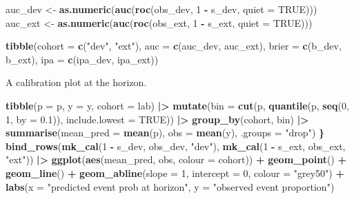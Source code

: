 \documentclass[
]{article}
\newenvironment{Shaded}{\begin{snugshade}}{\end{snugshade}}
\newcommand{\AttributeTok}[1]{\textcolor[rgb]{0.13,0.29,0.53}{#1}}
\newcommand{\ConstantTok}[1]{\textcolor[rgb]{0.56,0.35,0.01}{#1}}
\newcommand{\DecValTok}[1]{\textcolor[rgb]{0.00,0.00,0.81}{#1}}
\newcommand{\ErrorTok}[1]{\textcolor[rgb]{0.64,0.00,0.00}{\textbf{#1}}}
\newcommand{\FloatTok}[1]{\textcolor[rgb]{0.00,0.00,0.81}{#1}}
\newcommand{\FunctionTok}[1]{\textcolor[rgb]{0.13,0.29,0.53}{\textbf{#1}}}
\newcommand{\NormalTok}[1]{#1}
\newcommand{\OtherTok}[1]{\textcolor[rgb]{0.56,0.35,0.01}{#1}}
\newcommand{\SpecialCharTok}[1]{\textcolor[rgb]{0.81,0.36,0.00}{\textbf{#1}}}
\newcommand{\StringTok}[1]{\textcolor[rgb]{0.31,0.60,0.02}{#1}}
\begin{document}
\begin{Shaded}
\begin{Highlighting}[]
\NormalTok{auc\_dev }\OtherTok{\textless{}{-}} \FunctionTok{as.numeric}\NormalTok{(}\FunctionTok{auc}\NormalTok{(}\FunctionTok{roc}\NormalTok{(obs\_dev, }\DecValTok{1} \SpecialCharTok{{-}}\NormalTok{ s\_dev, }\AttributeTok{quiet =} \ConstantTok{TRUE}\NormalTok{)))}
\NormalTok{auc\_ext }\OtherTok{\textless{}{-}} \FunctionTok{as.numeric}\NormalTok{(}\FunctionTok{auc}\NormalTok{(}\FunctionTok{roc}\NormalTok{(obs\_ext, }\DecValTok{1} \SpecialCharTok{{-}}\NormalTok{ s\_ext, }\AttributeTok{quiet =} \ConstantTok{TRUE}\NormalTok{)))}

\FunctionTok{tibble}\NormalTok{(}\AttributeTok{cohort =} \FunctionTok{c}\NormalTok{(}\StringTok{"dev"}\NormalTok{, }\StringTok{"ext"}\NormalTok{),}
       \AttributeTok{auc =} \FunctionTok{c}\NormalTok{(auc\_dev, auc\_ext),}
       \AttributeTok{brier =} \FunctionTok{c}\NormalTok{(b\_dev, b\_ext),}
       \AttributeTok{ipa  =} \FunctionTok{c}\NormalTok{(ipa\_dev, ipa\_ext))}
\end{Highlighting}
\end{Shaded}

A calibration plot at the horizon.

\begin{Shaded}
\begin{Highlighting}[]
  \FunctionTok{tibble}\NormalTok{(}\AttributeTok{p =}\NormalTok{ p, }\AttributeTok{y =}\NormalTok{ y, }\AttributeTok{cohort =}\NormalTok{ lab) }\SpecialCharTok{|\textgreater{}}
    \FunctionTok{mutate}\NormalTok{(}\AttributeTok{bin =} \FunctionTok{cut}\NormalTok{(p, }\FunctionTok{quantile}\NormalTok{(p, }\FunctionTok{seq}\NormalTok{(}\DecValTok{0}\NormalTok{, }\DecValTok{1}\NormalTok{, }\AttributeTok{by =} \FloatTok{0.1}\NormalTok{)),}
                     \AttributeTok{include.lowest =} \ConstantTok{TRUE}\NormalTok{)) }\SpecialCharTok{|\textgreater{}}
    \FunctionTok{group\_by}\NormalTok{(cohort, bin) }\SpecialCharTok{|\textgreater{}}
    \FunctionTok{summarise}\NormalTok{(}\AttributeTok{mean\_pred =} \FunctionTok{mean}\NormalTok{(p), }\AttributeTok{obs =} \FunctionTok{mean}\NormalTok{(y), }\AttributeTok{.groups =} \StringTok{"drop"}\NormalTok{)}
\ErrorTok{\}}
\FunctionTok{bind\_rows}\NormalTok{(}\FunctionTok{mk\_cal}\NormalTok{(}\DecValTok{1} \SpecialCharTok{{-}}\NormalTok{ s\_dev, obs\_dev, }\StringTok{"dev"}\NormalTok{),}
          \FunctionTok{mk\_cal}\NormalTok{(}\DecValTok{1} \SpecialCharTok{{-}}\NormalTok{ s\_ext, obs\_ext, }\StringTok{"ext"}\NormalTok{)) }\SpecialCharTok{|\textgreater{}}
  \FunctionTok{ggplot}\NormalTok{(}\FunctionTok{aes}\NormalTok{(mean\_pred, obs, }\AttributeTok{colour =}\NormalTok{ cohort)) }\SpecialCharTok{+}
  \FunctionTok{geom\_point}\NormalTok{() }\SpecialCharTok{+} \FunctionTok{geom\_line}\NormalTok{() }\SpecialCharTok{+}
  \FunctionTok{geom\_abline}\NormalTok{(}\AttributeTok{slope =} \DecValTok{1}\NormalTok{, }\AttributeTok{intercept =} \DecValTok{0}\NormalTok{, }\AttributeTok{colour =} \StringTok{"grey50"}\NormalTok{) }\SpecialCharTok{+}
  \FunctionTok{labs}\NormalTok{(}\AttributeTok{x =} \StringTok{"predicted event prob at horizon"}\NormalTok{,}
       \AttributeTok{y =} \StringTok{"observed event proportion"}\NormalTok{)}
\end{Highlighting}
\end{Shaded}
\end{document}
